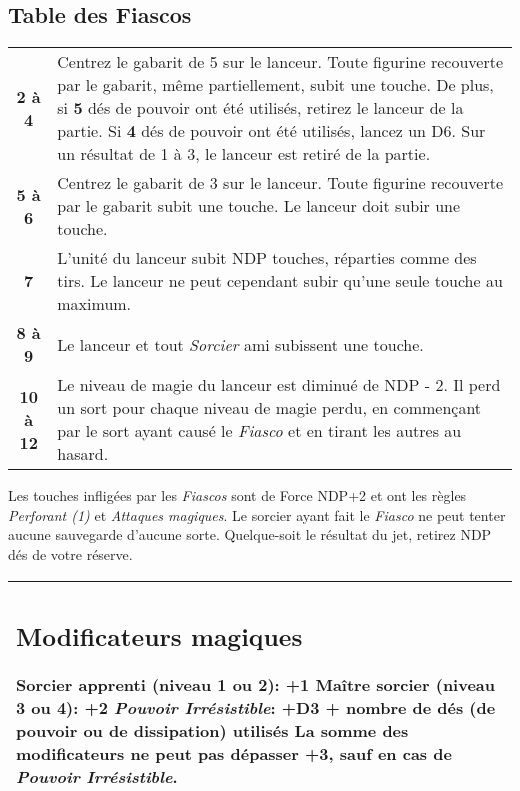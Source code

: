 \documentclass[a4paper,8pt]{extarticle}
\newcommand{\pouce}{\arcsecond}
\begin{document}
\begin{minipage}[t]{.5\linewidth}
\fontsize{10}{10}\selectfont

\subsection*{Table des Fiascos}

\begin{tabular}{cm{6.8cm}}
\hline
\textbf{2 à 4} & Centrez le gabarit de \unit{5}{\pouce} sur le lanceur. Toute figurine recouverte par le gabarit, même partiellement, subit une touche. De plus, si \textbf{5} dés de pouvoir ont été utilisés, retirez le lanceur de la partie. Si \textbf{4} dés de pouvoir ont été utilisés, lancez un D6. Sur un résultat de 1 à 3, le lanceur est retiré de la partie. \tabularnewline
\textbf{5 à 6} & Centrez le gabarit de \unit{3}{\pouce} sur le lanceur. Toute figurine recouverte par le gabarit subit une touche. Le lanceur doit subir une touche. \tabularnewline
\textbf{7} & L'unité du lanceur subit NDP touches, réparties comme des tirs. Le lanceur ne peut cependant subir qu'une seule touche au maximum. \tabularnewline
\textbf{8 à 9} & Le lanceur et tout \emph{Sorcier} ami subissent une touche. \tabularnewline
\textbf{10 à 12} & Le niveau de magie du lanceur est diminué de NDP - 2. Il perd un sort pour chaque niveau de magie perdu, en commençant par le sort ayant causé le \emph{Fiasco} et en tirant les autres au hasard. \tabularnewline
\hline
\end{tabular}

\bigskip
Les touches infligées par les \emph{Fiascos} sont de Force NDP+2 et ont les règles \emph{Perforant (1)} et \emph{Attaques magiques}.
\newline Le sorcier ayant fait le \emph{Fiasco} ne peut tenter aucune sauvegarde d'aucune sorte.
\bigskip \newline Quelque-soit le résultat du jet, retirez NDP dés de votre réserve.
\bigskip

\begin{tabular}{|m{8cm}|}
\hline
\vspace*{-0.4cm}
\subsection*{Modificateurs magiques}
\noindent Sorcier apprenti (niveau 1 ou 2): +1
\newline Maître sorcier (niveau 3 ou 4): +2
\newline \emph{Pouvoir Irrésistible}: +D3 + nombre de dés (de pouvoir ou de dissipation) utilisés
\medskip
\newline La somme des modificateurs ne peut pas dépasser +3, sauf en cas de \emph{Pouvoir Irrésistible}. \tabularnewline
\hline
\end{tabular}


\end{minipage}
\end{document}
